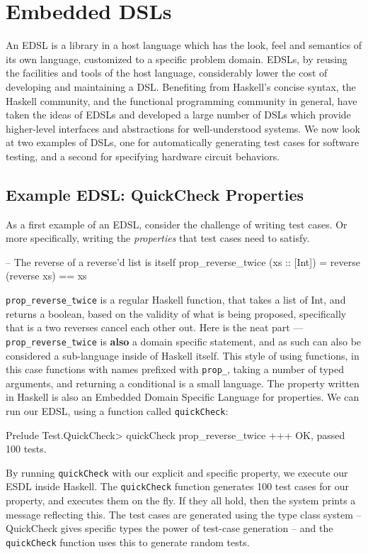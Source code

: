\documentclass[11pt]{article}
\begin{document}
\section{Embedded DSLs}

An EDSL is a library in a host language which has the look, feel and semantics of its own language,
customized to a specific problem domain.
EDSLs, by reusing the facilities and tools of the host language, considerably lower the cost of developing and maintaining a DSL.
Benefiting from Haskell's concise syntax, the Haskell community, and the functional programming
community in general, have taken the ideas
of EDSLs and developed a large number of DSLs
which provide higher-level interfaces and abstractions for well-understood systems.
We now look at two examples of DSLs, one for automatically generating test cases for software testing,
and a second for specifying hardware circuit behaviors.

\subsection{Example EDSL: QuickCheck Properties}

As a first example of an EDSL, consider the challenge of writing test cases.
Or more specifically, writing the {\em properties\/} that test cases need to satisfy.

\begin{Code}
-- The reverse of a reverse'd list is itself
prop_reverse_twice (xs :: [Int]) = reverse (reverse xs) == xs
\end{Code}

\verb|prop_reverse_twice| is a regular Haskell function,
that takes a list of Int, and returns a boolean, based
on the validity of what is being proposed, specifically
that is a two reverses cancel each other out. 
Here is the neat part --- \verb|prop_reverse_twice| is {\bf also\/} a
domain specific statement, and as such can also be considered
a sub-language inside of Haskell itself.  This style
of using functions, in this case functions with names
prefixed with \verb|prop_|, taking a number of typed
arguments, and returning a conditional is a small language.
The property written in Haskell is also an Embedded Domain Specific
Language for properties.
We can run our EDSL, using a function called \verb|quickCheck|:
\begin{Code}
Prelude Test.QuickCheck> quickCheck prop_reverse_twice
+++ OK, passed 100 tests.
\end{Code}
By running \verb|quickCheck| with our explicit and specific property,
we execute our ESDL inside Haskell. The \verb|quickCheck| function
generates 100 test cases for our property, and executes
them on the fly. If they all hold, then the system prints
a message reflecting this. The test cases are generated using
the type class system -- QuickCheck gives specific types the
power of test-case generation -- and the \verb|quickCheck| function
uses this to generate random tests.
\end{document}
